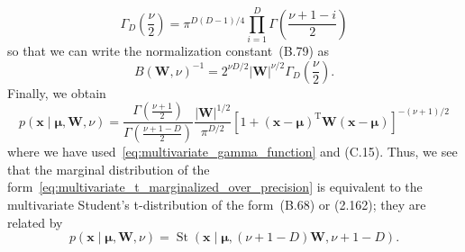 \documentclass[12pt,a4paper]{article}
\begin{document}
\begin{equation}
\Gamma_D \left(\frac{\nu}{2}\right) =
\pi^{D(D - 1)/4} \prod_{i=1}^{D} \Gamma\left(\frac{\nu + 1 - i}{2}\right)
\label{eq:multivariate_gamma_function}
\end{equation}
so that we can write the normalization constant~(B.79) as
\begin{equation}
B(\mathbf{W}, \nu)^{-1} =
2^{\nu D/2}
\left|\mathbf{W}\right|^{\nu/2}
\Gamma_D\left(\frac{\nu}{2}\right) .
\end{equation}
Finally, we obtain
\begin{equation}
p\left(\mathbf{x}\middle|\bm{\mu}, \mathbf{W}, \nu\right)
=
\frac{\Gamma\left(\frac{\nu + 1}{2}\right)}{\Gamma\left(\frac{\nu + 1 - D}{2}\right)}
\frac{\left|\mathbf{W}\right|^{1/2}}{\pi^{D/2}}
\left[
  1 + 
  \left(\mathbf{x} - \bm{\mu}\right)^{\operatorname{T}}
  \mathbf{W}
  \left(\mathbf{x} - \bm{\mu}\right)
\right]^{-(\nu + 1)/2}
\end{equation}
where we have used~\eqref{eq:multivariate_gamma_function} and (C.15).
Thus, we see that the marginal distribution of
the form~\eqref{eq:multivariate_t_marginalized_over_precision}
is equivalent to the multivariate Student's t-distribution of the form~(B.68) or (2.162);
they are related by
\begin{equation}
p\left(\mathbf{x}\middle|\bm{\mu}, \mathbf{W}, \nu\right)
=
\operatorname{St}\left(
  \mathbf{x}\middle|\bm{\mu},
  (\nu + 1 - D) \mathbf{W},
  \nu + 1 - D
\right) .
\label{eq:wishart_marginal_and_multivariate_t}
\end{equation}
\end{document}
